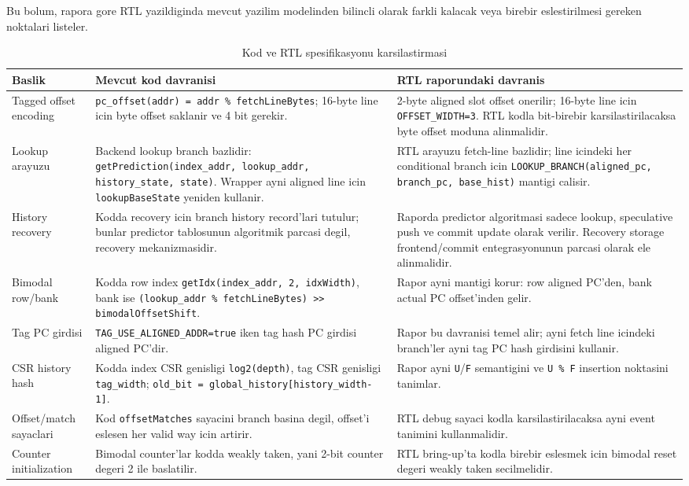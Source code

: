 \documentclass[11pt,a4paper]{article}
\newcommand{\code}[1]{\texttt{#1}}
\newcommand{\param}[1]{\texttt{#1}}
\begin{document}
Bu bolum, rapora gore RTL yazildiginda mevcut yazilim modelinden bilincli
olarak farkli kalacak veya birebir eslestirilmesi gereken noktalari listeler.

\begin{table}[!htbp]
\centering
\caption{Kod ve RTL spesifikasyonu karsilastirmasi}
\label{tab:code-rtl-diff}
\small
\begin{tabularx}{\linewidth}{lYY}
\toprule
Baslik & Mevcut kod davranisi & RTL raporundaki davranis \\
\midrule
Tagged offset encoding &
\code{pc\_offset(addr) = addr \% fetchLineBytes}; 16-byte line icin byte offset
saklanir ve 4 bit gerekir. &
2-byte aligned slot offset onerilir; 16-byte line icin
\code{OFFSET\_WIDTH=3}. RTL kodla bit-birebir karsilastirilacaksa byte offset
moduna alinmalidir. \\

Lookup arayuzu &
Backend lookup branch bazlidir:
\code{getPrediction(index\_addr, lookup\_addr, history\_state, state)}.
Wrapper ayni aligned line icin \code{lookupBaseState} yeniden kullanir. &
RTL arayuzu fetch-line bazlidir; line icindeki her conditional branch icin
\code{LOOKUP\_BRANCH(aligned\_pc, branch\_pc, base\_hist)} mantigi calisir. \\

History recovery &
Kodda recovery icin branch history record'lari tutulur; bunlar predictor
tablosunun algoritmik parcasi degil, recovery mekanizmasidir. &
Raporda predictor algoritmasi sadece lookup, speculative push ve commit update
olarak verilir. Recovery storage frontend/commit entegrasyonunun parcasi
olarak ele alinmalidir. \\

Bimodal row/bank &
Kodda row index \code{getIdx(index\_addr, 2, idxWidth)}, bank ise
\code{(lookup\_addr \% fetchLineBytes) >> bimodalOffsetShift}. &
Rapor ayni mantigi korur: row aligned PC'den, bank actual PC offset'inden
gelir. \\

Tag PC girdisi &
\param{TAG\_USE\_ALIGNED\_ADDR=true} iken tag hash PC girdisi aligned PC'dir. &
Rapor bu davranisi temel alir; ayni fetch line icindeki branch'ler ayni tag PC
hash girdisini kullanir. \\

CSR history hash &
Kodda index CSR genisligi \code{log2(depth)}, tag CSR genisligi
\code{tag\_width}; \code{old\_bit = global\_history[history\_width-1]}. &
Rapor ayni \code{U}/\code{F} semantigini ve \code{U \% F} insertion noktasini
tanimlar. \\

Offset/match sayaclari &
Kod \code{offsetMatches} sayacini branch basina degil, offset'i eslesen her
valid way icin artirir. &
RTL debug sayaci kodla karsilastirilacaksa ayni event tanimini kullanmalidir. \\

Counter initialization &
Bimodal counter'lar kodda weakly taken, yani 2-bit counter degeri 2 ile
baslatilir. &
RTL bring-up'ta kodla birebir eslesmek icin bimodal reset degeri weakly taken
secilmelidir. \\
\bottomrule
\end{tabularx}
\end{table}
\end{document}
